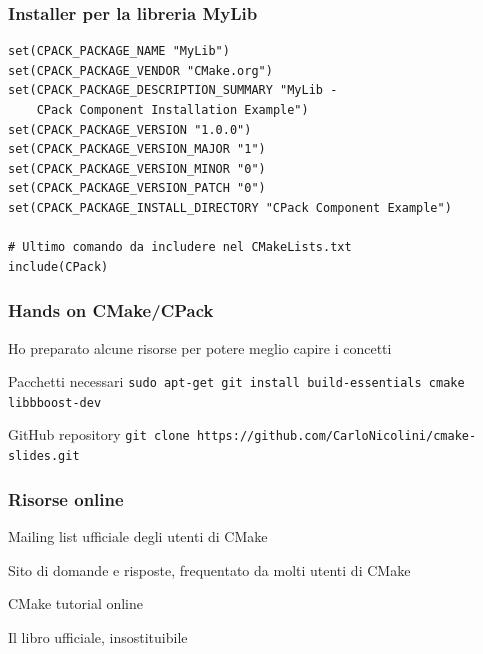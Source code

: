 \documentclass[10pt] {beamer}
\begin{document}
\begin{frame}[fragile]
 \frametitle{Installer per la libreria MyLib}
\begin{verbatim}
set(CPACK_PACKAGE_NAME "MyLib")
set(CPACK_PACKAGE_VENDOR "CMake.org")
set(CPACK_PACKAGE_DESCRIPTION_SUMMARY "MyLib - 
    CPack Component Installation Example")
set(CPACK_PACKAGE_VERSION "1.0.0")
set(CPACK_PACKAGE_VERSION_MAJOR "1")
set(CPACK_PACKAGE_VERSION_MINOR "0")
set(CPACK_PACKAGE_VERSION_PATCH "0")
set(CPACK_PACKAGE_INSTALL_DIRECTORY "CPack Component Example")

# Ultimo comando da includere nel CMakeLists.txt
include(CPack)
\end{verbatim}
\end{frame}


\begin{frame}
\frametitle{Hands on CMake/CPack}

Ho preparato alcune risorse per potere meglio capire i concetti 
\begin{block}{Pacchetti necessari}
\texttt{sudo apt-get git install build-essentials cmake libbboost-dev}
\end{block}

\begin{block}{GitHub repository}
\texttt{git clone https://github.com/CarloNicolini/cmake-slides.git} 
\end{block}

\end{frame}


\begin{frame}
\frametitle{Risorse online}
\begin{thebibliography}{10}

\beamertemplatearticlebibitems

Mailing list ufficiale degli utenti di CMake

Sito di domande e risposte, frequentato da molti utenti di CMake

CMake tutorial online

Il libro ufficiale, insostituibile
\end{thebibliography}
\end{frame}

\end{document}
